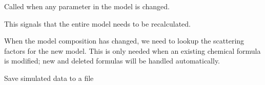 \documentclass[letterpaper,10pt,english]{sphinxmanual}
\begin{document}
\begin{fulllineitems}
\begin{fulllineitems}
\label{api/experiment:refl1d.experiment.ExperimentBase.update}
Called when any parameter in the model is changed.

This signals that the entire model needs to be recalculated.

\end{fulllineitems}


\begin{fulllineitems}
\label{api/experiment:refl1d.experiment.ExperimentBase.update_composition}
When the model composition has changed, we need to lookup the
scattering factors for the new model.  This is only needed
when an existing chemical formula is modified; new and
deleted formulas will be handled automatically.

\end{fulllineitems}


\begin{fulllineitems}
\label{api/experiment:refl1d.experiment.ExperimentBase.write_data}
Save simulated data to a file

\end{fulllineitems}


\end{fulllineitems}

\end{document}
